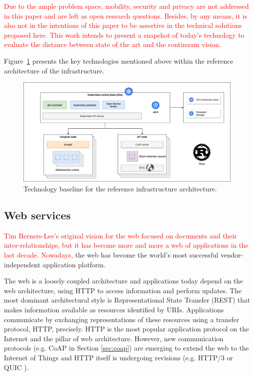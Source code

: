\textcolor{red}{Due to the ample problem space, mobility, security and privacy are not addressed in this paper and are left as open research questions. Besides, by any means, it is also not in the intentions of this paper to be assertive in the technical solutions proposed here. This work intends to present a snapshot of today's technology to evaluate the distance between state of the art and the continuum vision.}

Figure~\ref{fig:architecture-technologies} presents the key technologies mentioned above within the reference architecture of the infrastructure.

\begin{figure}[ht]
\centering
\includegraphics[width=\columnwidth]{figures/architecture-technologies}
\caption{Technology baseline for the reference infrastructure architecture.} \label{fig:architecture-technologies}
\end{figure}

\subsection{Web services}
\label{sec:web}

\textcolor{red}{Tim Berners-Lee's original vision for the web focused on documents and their inter-relationships, but it has become more and more a web of applications in the last decade. Nowadays, } the web has become the world's most successful vendor-independent application platform.

The web is a loosely coupled architecture and applications today depend on the web architecture, using HTTP to access information and perform updates. The most dominant architectural style is Representational State Transfer (REST) \cite{rest} that makes information available as resources identified by URIs. Applications communicate by exchanging representations of these resources using a transfer protocol, HTTP, precisely. HTTP is the most popular application protocol on the Internet and the pillar of web architecture. However, new communication protocols (e.g. CoAP in Section \ref{sec:coap}) are emerging to extend the web to the Internet of Things and HTTP itself is undergoing revisions (e.g. HTTP/3 or QUIC \cite{langley2017quic}).

